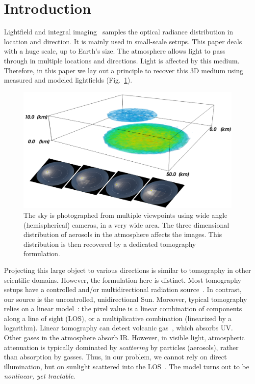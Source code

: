 \documentclass[10pt,twocolumn,letterpaper]{article}
\newcommand{\yoavcomment}[1]{}
\renewcommand{\yoavcomment}[1]{#1} %
\begin{document}
\section{Introduction}
\label{sec:intro}

Lightfield and integral
imaging~\cite{bishop,horstmeyer,kim,levoy,Perwass} samples the optical
radiance distribution in location and direction. It is mainly used in
small-scale setups. This paper deals with a huge scale, up to Earth's
size.  The atmosphere allows light to pass through in multiple
locations and directions. Light is affected by this medium. Therefore,
in this paper we lay out a principle to recover this 3D medium using
measured and modeled lightfields (Fig.~\ref{fig:front}).
\begin{figure}[t!]
  \centering
  \yoavcomment{\includegraphics[width=\columnwidth]{images/front_img.pdf}}
  \caption{\small The sky is photographed from multiple viewpoints
    using wide angle (hemispherical) cameras, in a very wide area. The
    three dimensional distribution of aerosols in the atmosphere
    affects the images. This distribution is then recovered by a
    dedicated tomography formulation.}
  \label{fig:front}
\end{figure}

Projecting this large object to various directions is similar to
tomography in other scientific domains. However, the formulation here
is distinct. Most tomography setups have a controlled and/or
multidirectional radiation source~\cite{gorbunov,messer}. In contrast,
our source is the uncontrolled, unidirectional Sun. Moreover, typical
tomography relies on a linear model~\cite{gregson}: the pixel value is
a linear combination of components along a line of sight (LOS), or a
multiplicative combination (linearized by a logarithm). Linear
tomography can detect volcanic gas~\cite{wright}, which absorbs
UV. Other gases in the atmosphere absorb IR. However, in visible
light, atmospheric attenuation is typically dominated by {\em
  scattering} by particles (aerosols), rather than absorption by
gasses. Thus, in our problem, we cannot rely on direct illumination,
but on sunlight scattered into the LOS~\cite{Seidel}.  The model turns
out to be {\em nonlinear, yet tractable}.
\end{document}
